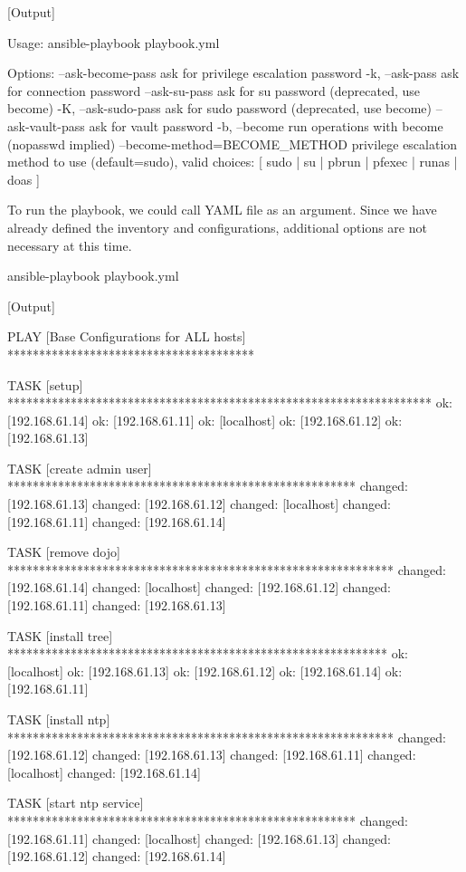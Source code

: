 [Output]\newline
\begin{code}
Usage: ansible-playbook playbook.yml

Options:
  --ask-become-pass     ask for privilege escalation password
  -k, --ask-pass        ask for connection password
  --ask-su-pass         ask for su password (deprecated, use become)
  -K, --ask-sudo-pass   ask for sudo password (deprecated, use become)
  --ask-vault-pass      ask for vault password
  -b, --become          run operations with become (nopasswd implied)
  --become-method=BECOME_METHOD
                        privilege escalation method to use (default=sudo),
                        valid choices: [ sudo | su | pbrun | pfexec | runas |
                        doas ]
\end{code}

To run the playbook, we could call YAML file as an argument. Since we have already defined the inventory and configurations, additional options are not necessary at this time.

\begin{code}
ansible-playbook playbook.yml
\end{code}

[Output]\newline
\begin{code}
PLAY [Base Configurations for ALL hosts] ***************************************

TASK [setup] *******************************************************************
ok: [192.168.61.14]
ok: [192.168.61.11]
ok: [localhost]
ok: [192.168.61.12]
ok: [192.168.61.13]

TASK [create admin user] *******************************************************
changed: [192.168.61.13]
changed: [192.168.61.12]
changed: [localhost]
changed: [192.168.61.11]
changed: [192.168.61.14]

TASK [remove dojo] *************************************************************
changed: [192.168.61.14]
changed: [localhost]
changed: [192.168.61.12]
changed: [192.168.61.11]
changed: [192.168.61.13]

TASK [install tree] ************************************************************
ok: [localhost]
ok: [192.168.61.13]
ok: [192.168.61.12]
ok: [192.168.61.14]
ok: [192.168.61.11]

TASK [install ntp] *************************************************************
changed: [192.168.61.12]
changed: [192.168.61.13]
changed: [192.168.61.11]
changed: [localhost]
changed: [192.168.61.14]

TASK [start ntp service] *******************************************************
changed: [192.168.61.11]
changed: [localhost]
changed: [192.168.61.13]
changed: [192.168.61.12]
changed: [192.168.61.14]
\end{code}

